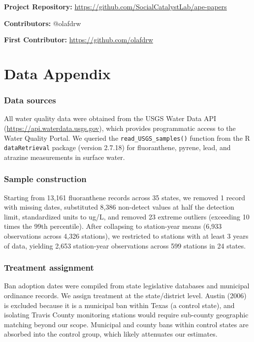 \documentclass[12pt]{article}
\begin{document}
\noindent\textbf{Project Repository:} \url{https://github.com/SocialCatalystLab/ape-papers}

\noindent\textbf{Contributors:} @olafdrw

\noindent\textbf{First Contributor:} \url{https://github.com/olafdrw}

\label{apep_main_text_end}
\newpage


\newpage
\appendix

\section{Data Appendix}

\subsubsection*{Data sources} All water quality data were obtained from the USGS Water Data API (\url{https://api.waterdata.usgs.gov}), which provides programmatic access to the Water Quality Portal. We queried the \texttt{read\_USGS\_samples()} function from the R \texttt{dataRetrieval} package (version 2.7.18) for fluoranthene, pyrene, lead, and atrazine measurements in surface water.

\subsubsection*{Sample construction} Starting from 13,161 fluoranthene records across 35 states, we removed 1 record with missing dates, substituted 8,386 non-detect values at half the detection limit, standardized units to ug/L, and removed 23 extreme outliers (exceeding 10 times the 99th percentile). After collapsing to station-year means (6,933 observations across 4,326 stations), we restricted to stations with at least 3 years of data, yielding 2,653 station-year observations across 599 stations in 24 states.

\subsubsection*{Treatment assignment} Ban adoption dates were compiled from state legislative databases and municipal ordinance records. We assign treatment at the state/district level. Austin (2006) is excluded because it is a municipal ban within Texas (a control state), and isolating Travis County monitoring stations would require sub-county geographic matching beyond our scope. Municipal and county bans within control states are absorbed into the control group, which likely attenuates our estimates.
\end{document}
